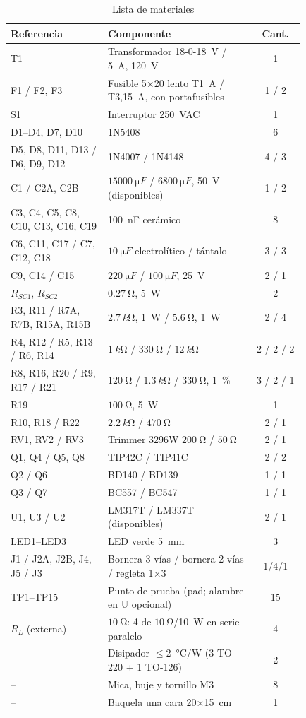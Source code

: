 \documentclass[conference]{IEEEtran}
\begin{document}
\begin{table}[htbp]
\caption{Lista de materiales}
\label{tab:bom}
\centering
\scriptsize\setlength{\tabcolsep}{3pt}
\begin{tabular}{@{}p{0.33\linewidth}p{0.50\linewidth}c@{}}
\toprule
Referencia & Componente & Cant. \\
\midrule
T1 & Transformador 18-0-18~V / 5~A, 120~V & 1 \\
F1 / F2, F3 & Fusible 5$\times$20 lento T1~A / T3,15~A, con portafusibles & 1 / 2 \\
S1 & Interruptor 250~VAC & 1 \\
D1--D4, D7, D10 & 1N5408 & 6 \\
D5, D8, D11, D13 / D6, D9, D12 & 1N4007 / 1N4148 & 4 / 3 \\
C1 / C2A, C2B & $\SI{15000}{\micro F}$ / $\SI{6800}{\micro F}$, 50~V (disponibles) & 1 / 2 \\
C3, C4, C5, C8, C10, C13, C16, C19 & 100~nF cerámico & 8 \\
C6, C11, C17 / C7, C12, C18 & $\SI{10}{\micro F}$ electrolítico / tántalo & 3 / 3 \\
C9, C14 / C15 & $\SI{220}{\micro F}$ / $\SI{100}{\micro F}$, 25~V & 2 / 1 \\
$R_{SC1}$, $R_{SC2}$ & $\SI{0,27}{\ohm}$, 5~W & 2 \\
R3, R11 / R7A, R7B, R15A, R15B & $\SI{2,7}{k\ohm}$, 1~W / $\SI{5,6}{\ohm}$, 1~W & 2 / 4 \\
R4, R12 / R5, R13 / R6, R14 & $\SI{1}{k\ohm}$ / $\SI{330}{\ohm}$ / $\SI{12}{k\ohm}$ & 2 / 2 / 2 \\
R8, R16, R20 / R9, R17 / R21 & $\SI{120}{\ohm}$ / $\SI{1,3}{k\ohm}$ / $\SI{330}{\ohm}$, 1~\% & 3 / 2 / 1 \\
R19 & $\SI{100}{\ohm}$, 5~W & 1 \\
R10, R18 / R22 & $\SI{2,2}{k\ohm}$ / $\SI{470}{\ohm}$ & 2 / 1 \\
RV1, RV2 / RV3 & Trimmer 3296W $\SI{200}{\ohm}$ / $\SI{50}{\ohm}$ & 2 / 1 \\
Q1, Q4 / Q5, Q8 & TIP42C / TIP41C & 2 / 2 \\
Q2 / Q6 & BD140 / BD139 & 1 / 1 \\
Q3 / Q7 & BC557 / BC547 & 1 / 1 \\
U1, U3 / U2 & LM317T / LM337T (disponibles) & 2 / 1 \\
LED1--LED3 & LED verde 5~mm & 3 \\
J1 / J2A, J2B, J4, J5 / J3 & Bornera 3 vías / bornera 2 vías / regleta 1$\times$3 & 1/4/1 \\
TP1--TP15 & Punto de prueba (pad; alambre en U opcional) & 15 \\
$R_L$ (externa) & $\SI{10}{\ohm}$: 4 de $\SI{10}{\ohm}$/10~W en serie-paralelo & 4 \\
-- & Disipador $\leq$2~°C/W (3 TO-220 + 1 TO-126) & 2 \\
-- & Mica, buje y tornillo M3 & 8 \\
-- & Baquela una cara 20$\times$15~cm & 1 \\
\bottomrule
\end{tabular}
\end{table}
\end{document}
